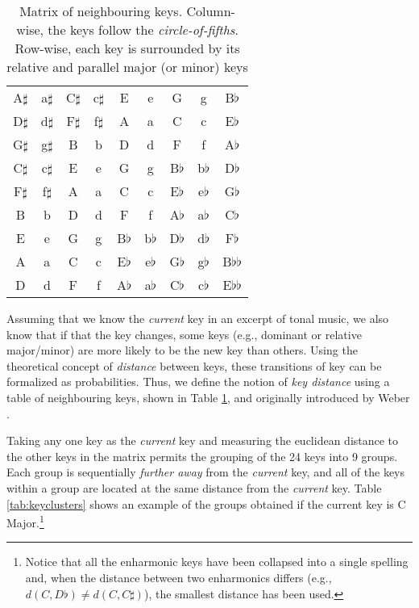\documentclass[sigconf]{acmart}
\begin{document}
\begin{table}[ht]
  \caption{Matrix of neighbouring keys. Column-wise, the keys follow the \emph{circle-of-fifths}. Row-wise, each key is surrounded by its relative and parallel major (or minor) keys}
  \label{tab:keydistance}
  \begin{tabular}{ccccccccc}
    \toprule
    A$\sharp$ & a$\sharp$ & C$\sharp$ & c$\sharp$ & E  & e  & G  & g  & B$\flat$\\
    D$\sharp$ & d$\sharp$ & F$\sharp$ & f$\sharp$ & A  & a  & C  & c  & E$\flat$\\
    G$\sharp$ & g$\sharp$ & B  & b  & D  & d  & F  & f  & A$\flat$\\
    C$\sharp$ & c$\sharp$ & E  & e  & G  & g  & B$\flat$ & b$\flat$ & D$\flat$\\
    F$\sharp$ & f$\sharp$ & A  & a  & C  & c  & E$\flat$ & e$\flat$ & G$\flat$\\
    B  & b  & D  & d  & F  & f  & A$\flat$ & a$\flat$ & C$\flat$\\
    E  & e  & G  & g  & B$\flat$ & b$\flat$ & D$\flat$ & d$\flat$ & F$\flat$\\
    A  & a  & C  & c  & E$\flat$ & e$\flat$ & G$\flat$ & g$\flat$ & B$\flat$$\flat$\\
    D  & d  & F  & f  & A$\flat$ & a$\flat$ & C$\flat$ & c$\flat$ & E$\flat$$\flat$\\
  \bottomrule
\end{tabular}
\end{table}

Assuming that we know the \emph{current} key in an excerpt of tonal music, we also know that if that the key changes, some keys (e.g., dominant or relative major/minor) are more likely to be the new key than others. Using the theoretical concept of \emph{distance} between keys, these transitions of key can be formalized as probabilities. Thus, we define the notion of \emph{key distance} using a table of neighbouring keys, shown in Table \ref{tab:keydistance}, and originally introduced by Weber \cite{weber1851}.

Taking any one key as the \emph{current} key and measuring the euclidean distance to the other keys in the matrix permits the grouping of the 24 keys into 9 groups. Each group is sequentially \emph{further away} from the \emph{current} key, and all of the keys within a group are located at the same distance from the \emph{current} key. Table \ref{tab:keyclusters} shows an example of the groups obtained if the current key is C Major.\footnote{Notice that all the enharmonic keys have been collapsed into a single spelling and, when the distance between two enharmonics differs (e.g., $d(C, D\flat) \neq d(C, C\sharp)$), the smallest distance has been used.}
\end{document}
